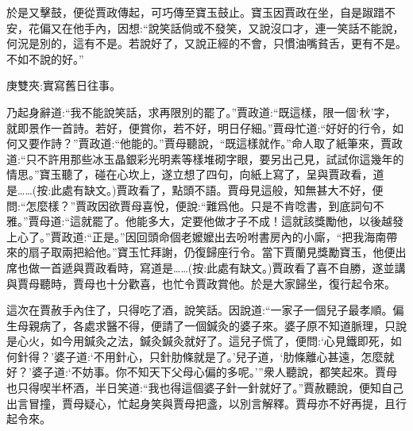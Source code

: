 \begin{parag}
    於是又擊鼓，便從賈政傳起，可巧傳至寶玉鼓止。寶玉因賈政在坐，自是踧踖不安，花偏又在他手內，因想:“說笑話倘或不發笑，又說沒口才，連一笑話不能說，何況是別的，這有不是。若說好了，又說正經的不會，只慣油嘴貧舌，更有不是。不如不說的好。”\begin{note}庚雙夾:實寫舊日往事。\end{note}乃起身辭道:“我不能說笑話，求再限別的罷了。”賈政道:“既這樣，限一個‘秋’字，就即景作一首詩。若好，便賞你，若不好，明日仔細。”賈母忙道:“好好的行令，如何又要作詩？”賈政道:“他能的。”賈母聽說，“既這樣就作。”命人取了紙筆來，賈政道:“只不許用那些冰玉晶銀彩光明素等樣堆砌字眼，要另出己見，試試你這幾年的情思。”寶玉聽了，碰在心坎上，遂立想了四句，向紙上寫了，呈與賈政看，道是……(按:此處有缺文。)賈政看了，點頭不語。賈母見這般，知無甚大不好，便問:“怎麼樣？”賈政因欲賈母喜悅，便說:“難爲他。只是不肯唸書，到底詞句不雅。”賈母道:“這就罷了。他能多大，定要他做才子不成！這就該獎勵他，以後越發上心了。”賈政道:“正是。”因回頭命個老嬤嬤出去吩咐書房內的小廝，“把我海南帶來的扇子取兩把給他。”寶玉忙拜謝，仍復歸座行令。當下賈蘭見獎勵寶玉，他便出席也做一首遞與賈政看時，寫道是……(按:此處有缺文。)賈政看了喜不自勝，遂並講與賈母聽時，賈母也十分歡喜，也忙令賈政賞他。於是大家歸坐，復行起令來。
\end{parag}


\begin{parag}
    這次在賈赦手內住了，只得吃了酒，說笑話。因說道:“一家子一個兒子最孝順。偏生母親病了，各處求醫不得，便請了一個鍼灸的婆子來。婆子原不知道脈理，只說是心火，如今用鍼灸之法，鍼灸鍼灸就好了。這兒子慌了，便問:‘心見鐵即死，如何針得？’婆子道:‘不用針心，只針肋條就是了。’兒子道，‘肋條離心甚遠，怎麼就好？’婆子道:‘不妨事。你不知天下父母心偏的多呢。’”衆人聽說，都笑起來。賈母也只得喫半杯酒，半日笑道:“我也得這個婆子針一針就好了。”賈赦聽說，便知自己出言冒撞，賈母疑心，忙起身笑與賈母把盞，以別言解釋。賈母亦不好再提，且行起令來。
\end{parag}


